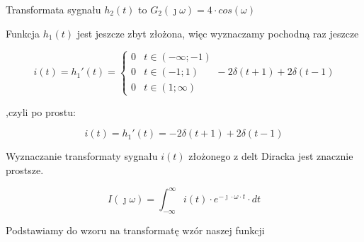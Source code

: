 \begin{task}
Transformata sygnału $h_2(t)$ to $G_2(\jmath \omega)=4 \cdot cos\left( \omega\right)$

Funkcja $h_1(t)$ jest jeszcze zbyt złożona, więc wyznaczamy pochodną raz jeszcze 

\begin{equation}
i(t)=h_1'(t)=\begin{cases}
0 & t \in \left( -\infty; -1 \right ) \\
0 & t \in \left( -1; 1 \right ) \\
0 & t \in \left( 1; \infty \right )
\end{cases} - 2 \delta(t+1) + 2 \delta(t-1)
\end{equation}

,czyli po prostu:

\begin{equation}
i(t)=h_1'(t)= -2 \delta(t+1) + 2 \delta(t-1)
\end{equation}

\begin{figure}[H]
  \centering
\end{figure}

Wyznaczanie transformaty sygnału $i(t)$ złożonego z delt Diracka jest znacznie prostsze. 

\begin{equation}
I(\jmath \omega )=\int_{-\infty }^{\infty}i(t) \cdot e^{-\jmath \cdot \omega \cdot t}\cdot dt
\end{equation}

Podstawiamy do wzoru na transformatę wzór naszej funkcji



\end{task}
